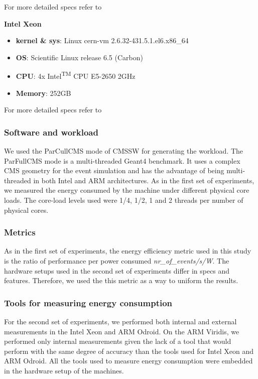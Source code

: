 For more detailed specs refer to \cite{odroid_specs}


\vspace{10mm}
\textbf{Intel Xeon}
\begin{itemize}
  \item[] \textbf{kernel \& sys}:  Linux cern-vm 2.6.32-431.5.1.el6.x86\_64
  \item[] \textbf{OS}: Scientific Linux release 6.5 (Carbon)
  \item[] \textbf{CPU}:    4x Intel\textsuperscript{TM} CPU E5-2650 \@2GHz
  \item[] \textbf{Memory}:        252GB
\end{itemize}

For more detailed specs refer to \cite{xeon_specs}


\subsubsection*{Software and workload}
We used the ParCullCMS mode of CMSSW for generating the workload. The ParFullCMS mode is a multi-threaded Geant4 \cite{GEANT4} benchmark. It uses a complex CMS geometry for the event simulation and has the advantage of being multi-threaded in both Intel and ARM architectures. As in the first set of experiments, we measured the energy consumed by the machine under different physical core loads. The core-load levels used were 1/4, 1/2, 1 and 2 threads per number of physical cores. 

\subsubsection*{Metrics}
As in the first set of experiments, the energy efficiency metric used in this study is the ratio of performance per power consumed \textit{nr\_of\_events/s/W}. The hardware setups used in the second set of experiments differ in specs and features. Therefore, we used the this metric as a way to uniform the results.

\subsubsection*{Tools for measuring energy consumption}
For the second set of experiments, we performed both internal and external measurements in the Intel Xeon and ARM Odroid. On the ARM Viridis, we performed only internal measurements given the lack of a tool that would perform with the same degree of accuracy than the tools used for Intel Xeon and ARM Odroid. All the tools used to measure energy consumption were embedded in the hardware setup of the machines.

